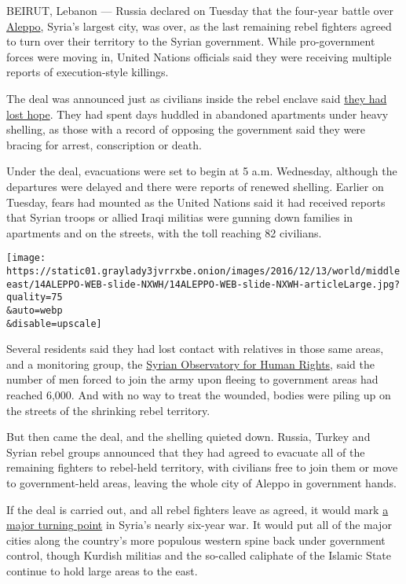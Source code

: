 BEIRUT, Lebanon --- Russia declared on Tuesday that the four-year battle
over
\href{http://www.nytimes3xbfgragh.onion/2016/12/14/world/middleeast/aleppo-syria-evacuation-deal.html}{Aleppo},
Syria's largest city, was over, as the last remaining rebel fighters
agreed to turn over their territory to the Syrian government. While
pro-government forces were moving in, United Nations officials said they
were receiving multiple reports of execution-style killings.

The deal was announced just as civilians inside the rebel enclave said
\href{https://www.nytimes3xbfgragh.onion/2016/12/10/world/middleeast/we-are-dead-either-way-agonizing-choices-for-syrians-in-aleppo.html?action=click\&contentCollection=Middle\%20East\&module=RelatedCoverage\&region=EndOfArticle\&pgtype=article}{they
had lost hope}. They had spent days huddled in abandoned apartments
under heavy shelling, as those with a record of opposing the government
said they were bracing for arrest, conscription or death.

Under the deal, evacuations were set to begin at 5 a.m. Wednesday,
although the departures were delayed and there were reports of renewed
shelling. Earlier on Tuesday, fears had mounted as the United Nations
said it had received reports that Syrian troops or allied Iraqi militias
were gunning down families in apartments and on the streets, with the
toll reaching 82 civilians.

\texttt{[image: https://static01.graylady3jvrrxbe.onion/images/2016/12/13/world/middleeast/14ALEPPO-WEB-slide-NXWH/14ALEPPO-WEB-slide-NXWH-articleLarge.jpg?quality=75\\\&auto=webp\\\&disable=upscale]}

Several residents said they had lost contact with relatives in those
same areas, and a monitoring group, the
\href{http://www.syriahr.com/en/}{Syrian Observatory for Human Rights},
said the number of men forced to join the army upon fleeing to
government areas had reached 6,000. And with no way to treat the
wounded, bodies were piling up on the streets of the shrinking rebel
territory.

But then came the deal, and the shelling quieted down. Russia, Turkey
and Syrian rebel groups announced that they had agreed to evacuate all
of the remaining fighters to rebel-held territory, with civilians free
to join them or move to government-held areas, leaving the whole city of
Aleppo in government hands.

If the deal is carried out, and all rebel fighters leave as agreed, it
would mark
\href{https://www.nytimes3xbfgragh.onion/2016/12/09/world/middleeast/syria-aleppo-united-nations.html?action=click\&contentCollection=Middle\%20East\&module=RelatedCoverage\&region=EndOfArticle\&pgtype=article}{a
major turning point} in Syria's nearly six-year war. It would put all of
the major cities along the country's more populous western spine back
under government control, though Kurdish militias and the so-called
caliphate of the Islamic State continue to hold large areas to the east.

